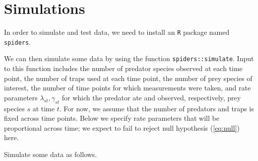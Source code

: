 \section*{Simulations}

In order to simulate and test data, we need to install an \texttt{R} package named \texttt{spiders}.

\begin{knitrout}
\color{fgcolor}\begin{kframe}
\begin{alltt}
\end{alltt}


{\ttfamily\noindent\bfseries\color{errorcolor}{\#\# Error: there is no package called 'spiders'}}\end{kframe}
\end{knitrout}


We can then simulate some data by using the function \texttt{spiders::simulate}.  Input to this function includes the number of predator species observed at each time point, the number of traps used at each time point, the number of prey species of interest, the number of time points for which measurements were taken, and rate parameters $\lambda_{st}, \gamma_{st}$ for which the predator ate and observed, respectively, prey species $s$ at time $t$.  For now, we assume that the number of predators and traps is fixed across time points.  Below we specify rate parameters that will be proportional across time; we expect to fail to reject null hypothesis (\ref{eq:null}) here. 

\begin{knitrout}
\color{fgcolor}\begin{kframe}
\begin{alltt}
 \hlkwb{<-} 
 \hlkwb{<-} 
 \hlkwb{<-} 
 \hlkwb{<-} 
 \hlkwb{<-} 
 \hlkwb{<-} 
\end{alltt}
\end{kframe}
\end{knitrout}


Simulate some data as follows.

\begin{knitrout}
\color{fgcolor}\begin{kframe}
\begin{alltt}
 \hlkwb{<-} 
\end{alltt}


{\ttfamily\noindent\bfseries{}}\end{kframe}
\end{knitrout}


